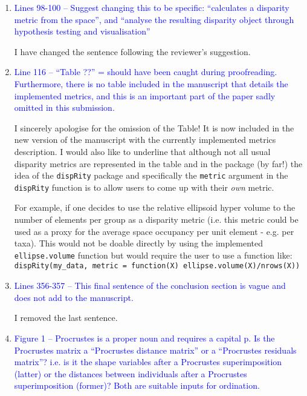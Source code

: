 \documentclass[12pt,letterpaper]{article}
\begin{document}
\begin{enumerate}
\item{\textcolor{blue}{Lines 98-100 – Suggest changing this to be specific: “calculates a disparity metric from the space”, and “analyse the resulting disparity object through hypothesis testing and visualisation”}}

I have changed the sentence following the reviewer's suggestion.

\item{\textcolor{blue}{Line 116 – “Table ??” = should have been caught during proofreading. Furthermore, there is no table included in the manuscript that details the implemented metrics, and this is an important part of the paper sadly omitted in this submission.}}
\label{table_missing}

I sincerely apologise for the omission of the Table! It is now included in the new version of the manuscript with the currently implemented metrics description.
I would also like to underline that although not all usual disparity metrics are represented in the table and in the package (by far!) the idea of the \texttt{dispRity} package and specifically the \texttt{metric} argument in the \texttt{dispRity} function is to allow users to come up with their \textit{own} metric.

For example, if one decides to use the relative ellipsoid hyper volume to the number of elements per group as a disparity metric (i.e. this metric could be used as a proxy for the average space occupancy per unit element - e.g. per taxa).
This would not be doable directly by using the implemented \texttt{ellipse.volume} function but would require the user to use a function like:\\
\texttt{dispRity(my\_data, metric = function(X) ellipse.volume(X)/nrows(X))}\\


\item{\textcolor{blue}{Lines 356-357 – This final sentence of the conclusion section is vague and does not add to the manuscript.}}
\label{remove_last_sentence}

I removed the last sentence.

\item{\textcolor{blue}{Figure 1 – Procrustes is a proper noun and requires a capital p. Is the Procrustes matrix a “Procrustes distance matrix” or a “Procrustes residuals matrix”? i.e. is it the shape variables after a Procrustes superimposition (latter) or the distances between individuals after a Procrustes superimposition (former)? Both are suitable inputs for ordination.}}


\end{enumerate}
\end{document}
